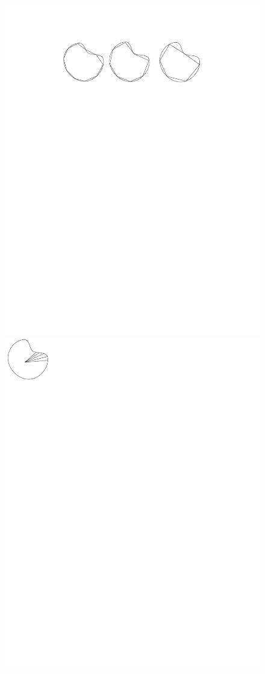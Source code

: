 \documentclass[xcolor=dvipsnames,xcolor=table]{beamer} %
\begin{document}
\begin{frame}
\begin{figure}[!htb]
		\includegraphics[width=1\linewidth]{PROYECTO/imgs/FnaClassification/FractalDimension}
		\endminipage\hfill
		\includegraphics[width=1\linewidth]{PROYECTO/imgs/FnaClassification/Smothness}

\end{figure}
\end{frame}
\end{document}
